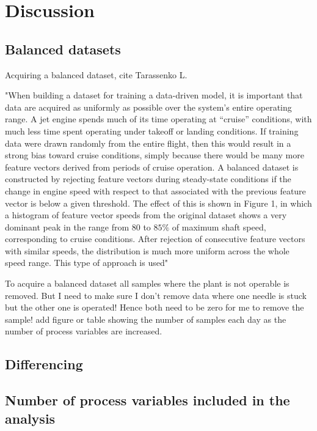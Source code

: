 \chapter{Discussion}\label{cha:discussion}

\section{Balanced datasets}
    
Acquiring a balanced dataset, cite Tarassenko L. 

"When building a dataset for training a data-driven model, it is important that data are acquired as uniformly as possible over the system’s entire operating range. A jet engine spends much of its time operating at “cruise” conditions, with much less time spent operating under takeoff or landing conditions. If training data were drawn randomly from the entire flight, then this would result in a strong bias toward cruise conditions, simply because there would be many more feature vectors derived from periods of cruise operation. A balanced dataset is constructed by rejecting feature vectors during steady-state conditions if the change in engine speed with respect to that associated with the previous feature vector is below a given threshold. The effect of this is shown in Figure 1, in which a histogram of feature vector speeds from the original dataset shows a very dominant peak in the range from 80 to $85\%$ of maximum shaft speed, corresponding to cruise conditions. After rejection of consecutive feature vectors with similar speeds, the distribution is much more uniform across the whole speed range. This type of approach is used"

To acquire a balanced dataset all samples where the plant is not operable is removed. But I need to make sure I don't remove data where one needle is stuck but the other one is operated! Hence both need to be zero for me to remove the sample! 
add figure or table showing the number of samples each day as the number of process variables are increased. 


\section{Differencing}


\section{Number of process variables included in the analysis}


